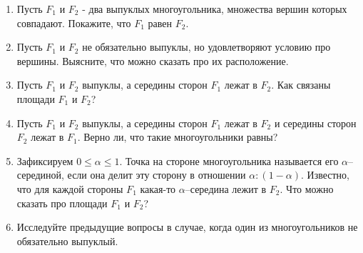 
\begin{enumerate}
\item Пусть $F_1$ и $F_2$ - два выпуклых многоугольника, множества вершин которых совпадают. Покажите, что $F_1$ равен $F_2$.
\item Пусть $F_1$ и $F_2$ не обязательно выпуклы, но удовлетворяют условию про вершины. Выясните, что можно сказать про их расположение.
\item Пусть $F_1$ и $F_2$ выпуклы, а середины сторон $F_1$ лежат в $F_2$. Как связаны площади $F_1$ и $F_2$?
\item Пусть $F_1$ и $F_2$ выпуклы, а середины сторон $F_1$ лежат в $F_2$ и середины сторон $F_2$ лежат в $F_1$. Верно ли, что такие многоугольники равны?
\item Зафиксируем $0\leq\alpha\leq 1$. Точка на стороне многоугольника называется его $\alpha$--серединой, если она делит эту сторону в отношении $\alpha:(1-\alpha)$. Известно, что для каждой стороны $F_1$ какая-то $\alpha$--середина лежит в $F_2$. Что можно сказать про площади $F_1$ и $F_2$?
\item Исследуйте предыдущие вопросы в случае, когда один из многоугольников не обязательно выпуклый. 
\end{enumerate}